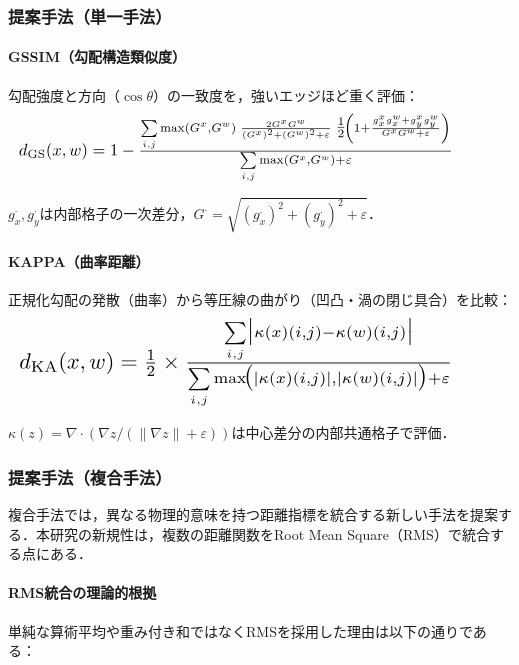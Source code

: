 \documentclass{jarticle}
\theoremstyle{definition}
\newcommand{\halfeq}[2][0.90\linewidth]{%
  \begin{equation}
    \makebox[\linewidth][l]{\resizebox{#1}{!}{\ensuremath{#2}}}%
  \end{equation}
}
\begin{document}
\subsubsection*{提案手法（単一手法）}
\paragraph{GSSIM（勾配構造類似度）}
勾配強度と方向（$\cos\theta$）の一致度を，強いエッジほど重く評価：
\halfeq{%
d_{\mathrm{GS}}(x,w)=1-
\frac{\sum\limits_{i,j} \max(G^x,G^w)\;
\frac{2G^xG^w}{(G^x)^2+(G^w)^2+\varepsilon}\;
\tfrac{1}{2}\!\left(1+\frac{g_x^x g_x^w+g_y^x g_y^w}{G^x G^w+\varepsilon}\right)
}{\sum\limits_{i,j}\max(G^x,G^w)+\varepsilon}%
}
$g_x^\cdot,g_y^\cdot$は内部格子の一次差分，$G^\cdot=\sqrt{(g_x^\cdot)^2+(g_y^\cdot)^2+\varepsilon}$．

\paragraph{KAPPA（曲率距離）}
正規化勾配の発散（曲率）から等圧線の曲がり（凹凸・渦の閉じ具合）を比較：
\halfeq{%
d_{\mathrm{KA}}(x,w)=\tfrac{1}{2}\times
\frac{\sum\limits_{i,j}\bigl|\kappa(x)(i,j)-\kappa(w)(i,j)\bigr|}
{\sum\limits_{i,j}\max\!\bigl(|\kappa(x)(i,j)|,|\kappa(w)(i,j)|\bigr)+\varepsilon}%
}
$\kappa(z)=\nabla\cdot\left(\nabla z/(\|\nabla z\|+\varepsilon)\right)$は中心差分の内部共通格子で評価．

\subsubsection*{提案手法（複合手法）}
複合手法では，異なる物理的意味を持つ距離指標を統合する新しい手法を提案する．本研究の新規性は，複数の距離関数をRoot Mean Square（RMS）で統合する点にある．

\paragraph{RMS統合の理論的根拠}
単純な算術平均や重み付き和ではなくRMSを採用した理由は以下の通りである：
\end{document}
